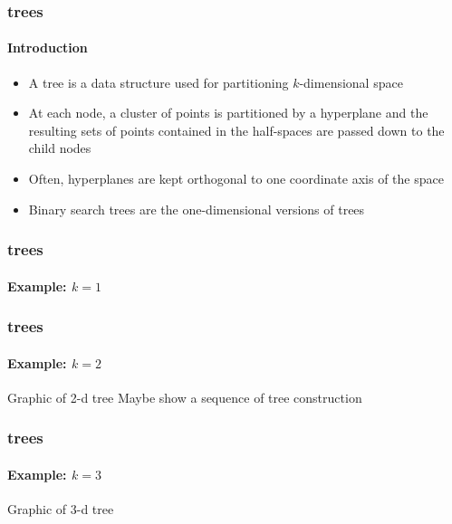

\begin{frame}
  \frametitle{\kd trees}
  \framesubtitle{Introduction}

  \begin{itemize}
    \item A \kd tree is a data structure used for partitioning $k$-dimensional space
    \item At each node, a cluster of points is partitioned by a hyperplane and the resulting
      sets of points contained in the half-spaces are passed down to the child nodes
    \item Often, hyperplanes are kept orthogonal to one coordinate axis of the space
    \item Binary search trees are the one-dimensional versions of \kd trees
  \end{itemize}

\end{frame}

\begin{frame}
  \frametitle{\kd trees}
  \framesubtitle{Example: $k=1$}

  \begin{figure}
    \centering
    
  \end{figure}
  
\end{frame}

\begin{frame}
  \frametitle{\kd trees}
  \framesubtitle{Example: $k=2$}
  
  Graphic of 2-d tree
  Maybe show a sequence of tree construction 
  
\end{frame}

\begin{frame}
  \frametitle{\kd trees}
  \framesubtitle{Example: $k=3$}
  
  Graphic of 3-d tree
  
\end{frame}


